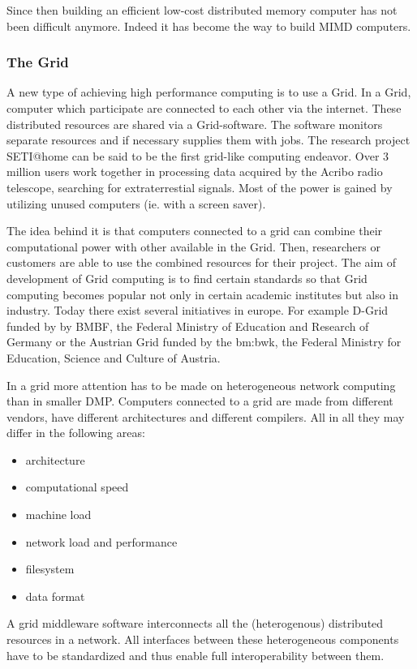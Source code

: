 Since then building an efficient low-cost distributed memory computer
has not been difficult anymore. Indeed it has become the way to build
MIMD computers.

\subsubsection{The Grid}

A new type of achieving high performance computing is to use a
Grid. In a Grid, computer which participate are connected to each other
via the internet. These distributed resources are shared via a
Grid-software. The software monitors separate resources and if
necessary supplies them with jobs. The research project SETI@home can
be said to be the first grid-like computing endeavor. Over 3 million
users work together in processing data acquired by the Acribo radio
telescope, searching for extraterrestial signals. Most of the power is
gained by utilizing unused computers (ie. with a screen saver).

The idea behind it is that computers connected to a grid can combine
their computational power with other available in the
Grid. Then, researchers or customers are able to use the combined
resources for their project. The aim of development of Grid computing
is to find certain standards so that Grid computing becomes popular
not only in certain academic institutes but also in industry. Today
there exist several initiatives in europe. For example D-Grid funded
by by BMBF, the Federal Ministry of Education and Research of Germany
or the Austrian Grid funded by the bm:bwk, the Federal Ministry for
Education, Science and Culture of Austria. 

In a grid more attention has to be made on heterogeneous network
computing than in smaller DMP. Computers connected to a grid are made
from different vendors, have different architectures and different
compilers. All in all they may differ in the following areas:

\begin{itemize}
\item architecture
\item computational speed
\item machine load
\item network load and performance
\item filesystem
\item data format
\end{itemize}

A grid middleware software interconnects all the (heterogenous)
distributed resources in a network.  
All interfaces between these heterogeneous components have to be standardized
and thus enable full interoperability between them.

